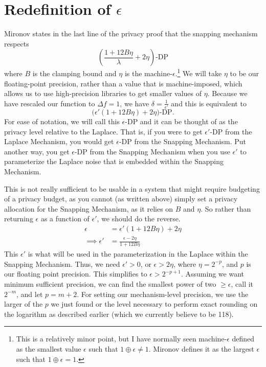 \documentclass[11pt]{scrartcl} %
\begin{document}
\section{Redefinition of $\epsilon$}
\label{sec:redefine_epsilon}
Mironov states in the last line of the privacy proof that the snapping mechanism respects
\[ \left( \frac{1 + 12B\eta}{\lambda} + 2\eta \right)\text{-DP} \]
where $B$ is the clamping bound and $\eta$ is the machine-$\epsilon$.\footnote{This is a relatively minor point, but I have normally seen machine-$\epsilon$ defined as the smallest value $\epsilon$ such that $1 \oplus \epsilon \neq 1$. Mironov defines it as the largest $\epsilon$ such that $1 \oplus \epsilon = 1$.} We will take $\eta$ to be our floating-point precision, rather than a value that is machine-imposed, which allows us to use high-precision libraries to get smaller values of $\eta$.
Because we have rescaled our function to $\Delta f = 1$, we have $\delta = \frac{1}{\epsilon'}$ and this is equivalent to
\[ \big( \epsilon'(1 + 12B\eta) + 2\eta \big)\text{-DP}. \]
For ease of notation, we will call this $\epsilon$-DP and it can be thought of as the privacy level relative to the Laplace. That is, if you were to get $\epsilon'$-DP from the Laplace Mechanism, you would get $\epsilon$-DP from the Snapping Mechanism. Put another way, you get $\epsilon$-DP from the Snapping Mechanism when you use $\epsilon'$ to parameterize the Laplace noise that is embedded within the Snapping Mechanism. \newline

This is not really sufficient to be usable in a system that might require budgeting of a privacy budget, as you cannot (as written above) simply set a privacy allocation for the Snapping Mechanism, as it relies on $B$ and $\eta$. So rather than returning $\epsilon$ as a function of $\epsilon'$, we should do the reverse.
\begin{align}
             \epsilon &= \epsilon'(1 + 12B\eta) + 2\eta \nonumber \\
    \implies \epsilon' &= \frac{\epsilon - 2\eta}{1 + 12B \eta} \nonumber
\end{align}
This $\epsilon'$ is what will be used in the parameterization in the Laplace within the Snapping Mechanism. Thus, we need $\epsilon' > 0$, or $\epsilon > 2\eta$, where $\eta = 2^{-p}$, and $p$ is our floating point precision. This simplifies to $\epsilon > 2^{-p+1}$. Assuming we want minimum sufficient precision, we can find the smallest power of two $\geq \epsilon$, call it $2^{-m}$, and let $p = m+2$. For setting our mechanism-level precision, we use the larger of the $p$ we just found or the level necessary to perform exact rounding on the logarithm as described earlier (which we currently believe to be 118).
\end{document}
